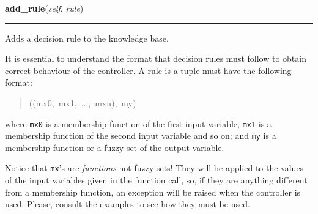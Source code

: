    \begin{boxedminipage}{\textwidth}

    \raggedright \textbf{add\_rule}(\textit{self}, \textit{rule})

    \vspace{-1.5ex}

    \rule{\textwidth}{0.5\fboxrule}

Adds a decision rule to the knowledge base.

It is essential to understand the format that decision rules must follow
to obtain correct behaviour of the controller. A rule is a tuple must
have the following format:
\begin{quote}{\ttfamily \raggedright \noindent
((mx0,~mx1,~...,~mxn),~my)
}\end{quote}

where \texttt{mx0} is a membership function of the first input variable,
\texttt{mx1} is a membership function of the second input variable and so on;
and \texttt{my} is a membership function or a fuzzy set of the output
variable.

Notice that \texttt{mx}'s are \emph{functions} not fuzzy sets! They will be
applied to the values of the input variables given in the function call,
so, if they are anything different from a membership function, an
exception will be raised when the controller is used. Please, consult
the examples to see how they must be used.
    \vspace{1ex}

    \end{boxedminipage}

    \label{peach:fuzzy:control:Controller:add_table}

    \vspace{0.5ex}


